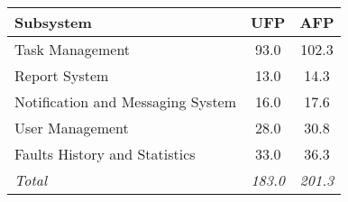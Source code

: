 
\begin{tabular}{l|c|c}
\textbf{Subsystem} & \textbf{UFP} & \textbf{AFP} \\ \hline
Task Management	& 93.0 & 102.3 \\
Report System & 13.0 & 14.3 \\
Notification and Messaging System & 16.0 & 17.6 \\
User Management & 28.0 & 30.8 \\
Faults History and Statistics & 33.0 & 36.3 \\ \hline
\textit{Total} & \textit{183.0} & \textit{201.3}
\end{tabular}
